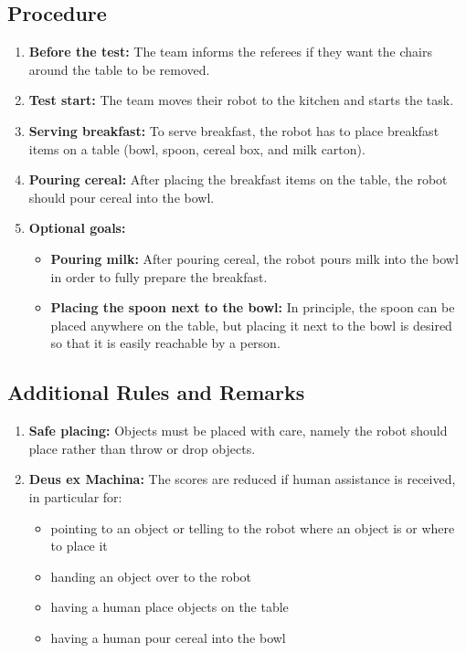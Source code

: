 \subsection*{Procedure}
\begin{enumerate}[nosep]
	\item \textbf{Before the test:} The team informs the referees if they want the chairs around the table to be removed.
	\item \textbf{Test start:} The team moves their robot to the kitchen and starts the task.
	\item \textbf{Serving breakfast:} To serve breakfast, the robot has to place breakfast items on a table (bowl, spoon, cereal box, and milk carton).
	\item \textbf{Pouring cereal:} After placing the breakfast items on the table, the robot should pour cereal into the bowl.
	\item \textbf{Optional goals:}
		\begin{itemize}
			\item \textbf{Pouring milk:} After pouring cereal, the robot pours milk into the bowl in order to fully prepare the breakfast.
			\item \textbf{Placing the spoon next to the bowl:} In principle, the spoon can be placed anywhere on the table, but placing it next to the bowl is desired so that it is easily reachable by a person.
		\end{itemize}
\end{enumerate}

\subsection*{Additional Rules and Remarks}
\begin{enumerate}[nosep]
	\item \textbf{Safe placing:} Objects must be placed with care, namely the robot should place rather than throw or drop objects.
	\item \textbf{Deus ex Machina:} The scores are reduced if human assistance is received, in particular for:
	\begin{itemize}[nosep]
		\item pointing to an object or telling to the robot where an object is or where to place it
		\item handing an object over to the robot
		\item having a human place objects on the table
		\item having a human pour cereal into the bowl
	\end{itemize}
\end{enumerate}

